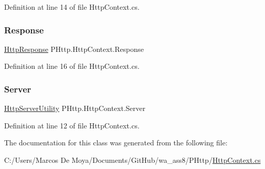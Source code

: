 Definition at line 14 of file Http\+Context.\+cs.

\mbox{\label{class_p_http_1_1_http_context_a7c7a021a69279040a6229a0c40719083}} 
\subsubsection{\texorpdfstring{Response}{Response}}
{\footnotesize\ttfamily \hyperlink{class_p_http_1_1_http_response}{Http\+Response} P\+Http.\+Http\+Context.\+Response\hspace{0.3cm}{\ttfamily [get]}}



Definition at line 16 of file Http\+Context.\+cs.

\mbox{\label{class_p_http_1_1_http_context_a9296bc89f3b2af71642609f2d516a0fc}} 
\subsubsection{\texorpdfstring{Server}{Server}}
{\footnotesize\ttfamily \hyperlink{class_p_http_1_1_http_server_utility}{Http\+Server\+Utility} P\+Http.\+Http\+Context.\+Server\hspace{0.3cm}{\ttfamily [get]}}



Definition at line 12 of file Http\+Context.\+cs.



The documentation for this class was generated from the following file\+:\begin{DoxyCompactItemize}
\item 
C\+:/\+Users/\+Marcos De Moya/\+Documents/\+Git\+Hub/wa\+\_\+ass8/\+P\+Http/\hyperlink{_http_context_8cs}{Http\+Context.\+cs}\end{DoxyCompactItemize}
